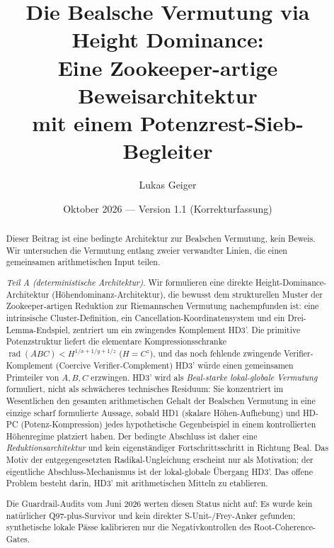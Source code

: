 \documentclass[11pt,a4paper]{article}
\title{Die Bealsche Vermutung via Height Dominance:\\
Eine Zookeeper-artige Beweisarchitektur\\
mit einem Potenzrest-Sieb-Begleiter}
\author{Lukas Geiger}
\date{Oktober 2026 --- Version 1.1 (Korrekturfassung)}
\DeclareMathOperator{\rad}{rad}
\begin{document}
\maketitle

\begin{abstract}
\enlargethispage{5\baselineskip}
\setlength{\parskip}{0.5ex}
Dieser Beitrag ist eine bedingte Architektur zur Bealschen Vermutung, kein
Beweis. Wir untersuchen die Vermutung entlang zweier verwandter Linien,
die einen gemeinsamen arithmetischen Input teilen.

\emph{Teil A (deterministische Architektur).}
Wir formulieren eine direkte Height-Dominance-Architektur (Höhendominanz-Architektur), die bewusst dem strukturellen Muster der Zookeeper-artigen Reduktion zur Riemannschen Vermutung nachempfunden ist: eine intrinsische Cluster-Definition, ein Cancellation-Koordinatensystem und ein Drei-Lemma-Endspiel, zentriert um ein zwingendes Komplement HD3'. Die primitive Potenzstruktur liefert die elementare Kompressionsschranke $\rad(ABC) < H^{1/x+1/y+1/z}$ ($H=C^z$),
und das noch fehlende zwingende Verifier-Komplement (Coercive Verifier-Complement) HD3' würde einen gemeinsamen Primteiler von $A,B,C$ erzwingen. HD3' wird als
\emph{Beal-starke lokal-globale Vermutung} formuliert, nicht als
schwächeres technisches Residuum: Sie konzentriert im Wesentlichen den
gesamten arithmetischen Gehalt der Bealschen Vermutung in eine einzige
scharf formulierte Aussage, sobald HD1 (skalare Höhen-Aufhebung) und
HD-PC (Potenz-Kompression) jedes hypothetische Gegenbeispiel in einem
kontrollierten Höhenregime platziert haben. Der bedingte Abschluss ist
daher eine \emph{Reduktionsarchitektur} und kein eigenständiger
Fortschrittsschritt in Richtung Beal. Das Motiv der entgegengesetzten
Radikal-Ungleichung erscheint nur als Motivation; der eigentliche
Abschluss-Mechanismus ist der lokal-globale Übergang HD3'. Das offene
Problem besteht darin, HD3' mit arithmetischen Mitteln zu etablieren.

Die Guardrail-Audits vom Juni 2026 werten diesen Status nicht auf: Es
wurde kein natürlicher Q97-plus-Survivor und kein direkter
S-Unit-/Frey-Anker gefunden; synthetische lokale Pässe kalibrieren nur
die Negativkontrollen des Root-Coherence-Gates.


\end{abstract}
\end{document}
